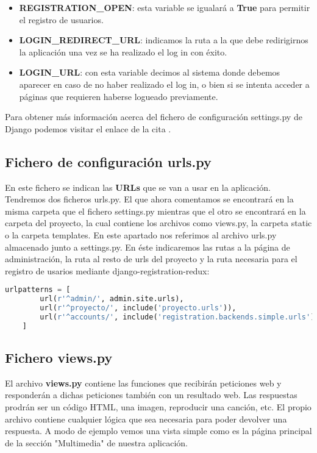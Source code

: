 \begin{itemize}
	\item \textbf{REGISTRATION\_OPEN}: esta variable se igualará a \textbf{True} para permitir el registro de usuarios.
	
	\item \textbf{LOGIN\_REDIRECT\_URL}: indicamos la ruta a la que debe redirigirnos la aplicación una vez se ha realizado el log in con éxito.
	
	\item \textbf{LOGIN\_URL}: con esta variable decimos al sistema donde debemos aparecer en caso de no haber realizado el log in, o bien si se intenta acceder a páginas que requieren haberse logueado previamente.
\end{itemize}

Para obtener más información acerca del fichero de configuración settings.py de Django podemos visitar el enlace de la cita \cite{cita_django_settings}.

\subsection{Fichero de configuración urls.py}
En este fichero se indican las \textbf{URLs} que se van a usar en la aplicación. Tendremos dos ficheros urls.py. El que ahora comentamos se encontrará en la misma carpeta que el fichero settings.py mientras que el otro se encontrará en la carpeta del proyecto, la cual contiene los archivos como views.py, la carpeta static o la carpeta templates. En este apartado nos referimos al archivo urls.py almacenado junto a settings.py. En éste indicaremos las rutas a la página de administración, la ruta al resto de urls del proyecto y la ruta necesaria para el registro de usarios mediante django-registration-redux: \\

\begin{lstlisting}[language=python]
	urlpatterns = [
		url(r'^admin/', admin.site.urls),
		url(r'^proyecto/', include('proyecto.urls')),
		url(r'^accounts/', include('registration.backends.simple.urls')),
	]
\end{lstlisting}

\subsection{Fichero views.py}
El archivo \textbf{views.py} contiene las funciones que recibirán peticiones web y responderán a dichas peticiones también con un resultado web. Las respuestas prodrán ser un código HTML, una imagen, reproducir una canción, etc. El propio archivo contiene cualquier lógica que sea necesaria para poder devolver una respuesta. A modo de ejemplo vemos una vista simple como es la página principal de la sección "Multimedia" de nuestra aplicación. \\

